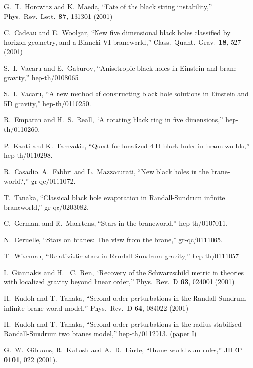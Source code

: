 \documentclass[a4paper,showpacs,preprintnumbers,amsmath,amssymb]{revtex4}
\begin{document}
\begin{thebibliography}{99}
  
G.~T.~Horowitz and K.~Maeda,
 ``Fate of the black string instability,''
Phys.\ Rev.\ Lett.\  {\bf 87}, 131301 (2001)
 

C.~Cadeau and E.~Woolgar,
 ``New five dimensional black holes classified by horizon geometry, and a  Bianchi VI braneworld,''
Class.\ Quant.\ Grav.\  {\bf 18}, 527 (2001)
 

 
S.~I.~Vacaru and E.~Gaburov,
 ``Anisotropic black holes in Einstein and brane gravity,''
 hep-th/0108065.

  
S.~I.~Vacaru,
 ``A new method of constructing black hole solutions in Einstein and 5D  gravity,''
 hep-th/0110250.
 

R.~Emparan and H.~S.~Reall,
 ``A rotating black ring in five dimensions,''
 hep-th/0110260.
 
P.~Kanti and K.~Tamvakis,
 ``Quest for localized 4-D black holes in brane worlds,''
 hep-th/0110298.
 
 
R.~Casadio, A.~Fabbri and L.~Mazzacurati,
 ``New black holes in the brane-world?,''
 gr-qc/0111072.

T.~Tanaka,
 ``Classical black hole evaporation in Randall-Sundrum infinite  braneworld,''
 gr-qc/0203082. 

 
 
C.~Germani and R.~Maartens,
 ``Stars in the braneworld,''
 hep-th/0107011.

N.~Deruelle,
 ``Stars on branes: The view from the brane,''
 gr-qc/0111065.
 

 
 
 

 
T.~Wiseman,
 ``Relativistic stars in Randall-Sundrum gravity,''
hep-th/0111057.
 
 
I.~Giannakis and H.~ C.~Ren,
 ``Recovery of the Schwarzschild metric in theories with localized gravity  beyond linear order,''
Phys.\ Rev.\ D {\bf 63}, 024001 (2001)


H.~Kudoh and T.~Tanaka,
 ``Second order perturbations in the Randall-Sundrum infinite brane-world  model,''
Phys.\ Rev.\ D {\bf 64}, 084022 (2001)
 

 H.~Kudoh and T.~Tanaka,
 ``Second order perturbations in the radius stabilized Randall-Sundrum two  branes model,''
 hep-th/0112013. (paper I)
 
G.~W.~Gibbons, R.~Kallosh and A.~D.~Linde,
 ``Brane world sum rules,''
JHEP {\bf 0101}, 022 (2001).



\end{thebibliography}  
\end{document}
